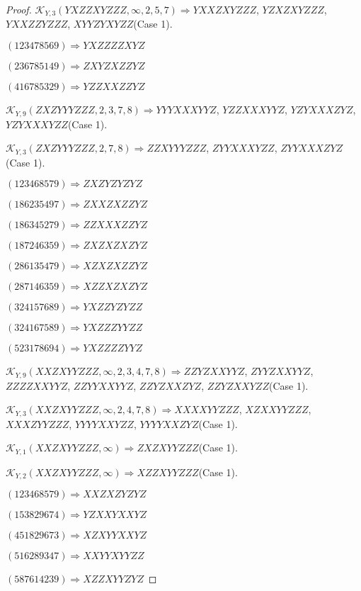 \documentclass[12pt]{article}
\theoremstyle{plain}
\theoremstyle{definition}
\theoremstyle{remark}
\newcommand{\fancy}[1]{\mathcal{#1}}
\def\K{\fancy{K}}
\begin{document}
\begin{proof}
	$\K_{Y,3}(YXZZXYZZZ,\infty,2, 5, 7)\Rightarrow $$YXXZXYZZZ$, $YZXZXYZZZ$, $YXXZZYZZZ$, $XYYZYXYZZ$(Case 1).
	
	
	
	$(1 2 3 4 7 8 5 6 9)\Rightarrow YXZZZZXYZ$
	
	$(2 3 6 7 8 5 1 4 9)\Rightarrow ZXYZXZZYZ$
	
	$(4 1 6 7 8 5 3 2 9)\Rightarrow YZZXXZZYZ$
	
	
	
	$\K_{Y,9}(ZXZYYYZZZ,2, 3, 7, 8)\Rightarrow $$YYYXXXYYZ$, $YZZXXXYYZ$, $YZYXXXZYZ$, $YZYXXXYZZ$(Case 1).
	
	$\K_{Y,3}(ZXZYYYZZZ,2, 7, 8)\Rightarrow $$ZZXYYYZZZ$, $ZYYXXXYZZ$, $ZYYXXXZYZ$(Case 1).
	
	
	
	$(1 2 3 4 6 8 5 7 9)\Rightarrow ZXZYZYZYZ$
	
	$(1 8 6 2 3 5 4 9 7)\Rightarrow ZXXZXZZYZ$
	
	$(1 8 6 3 4 5 2 7 9)\Rightarrow ZZXXXZZYZ$
	
	$(1 8 7 2 4 6 3 5 9)\Rightarrow ZXZXZXZYZ$
	
	$(2 8 6 1 3 5 4 7 9)\Rightarrow XZXZXZZYZ$
	
	$(2 8 7 1 4 6 3 5 9)\Rightarrow XZZXZXZYZ$
	
	$(3 2 4 1 5 7 6 8 9)\Rightarrow YXZZYZYZZ$
	
	$(3 2 4 1 6 7 5 8 9)\Rightarrow YXZZZYYZZ$
	
	$(5 2 3 1 7 8 6 9 4)\Rightarrow YXZZZZYYZ$
	
	
	
	$\K_{Y,9}(XXZXYYZZZ,\infty,2, 3, 4, 7, 8)\Rightarrow $$ZZYZXXYYZ$, $ZYYZXXYYZ$, $ZZZZXXYYZ$, $ZZYYXXYYZ$, $ZZYZXXZYZ$, $ZZYZXXYZZ$(Case 1).
	
	$\K_{Y,3}(XXZXYYZZZ,\infty,2, 4, 7, 8)\Rightarrow $$XXXXYYZZZ$, $XZXXYYZZZ$, $XXXZYYZZZ$, $YYYYXXYZZ$, $YYYYXXZYZ$(Case 1).
	
	$\K_{Y,1}(XXZXYYZZZ,\infty)\Rightarrow $$ZXZXYYZZZ$(Case 1).
	
	$\K_{Y,2}(XXZXYYZZZ,\infty)\Rightarrow $$XZZXYYZZZ$(Case 1).
	
	
	
	$(1 2 3 4 6 8 5 7 9)\Rightarrow XXZXZYZYZ$
	
	$(1 5 3 8 2 9 6 7 4)\Rightarrow YZXXYXXYZ$
	
	$(4 5 1 8 2 9 6 7 3)\Rightarrow XZXYYXXYZ$
	
	$(5 1 6 2 8 9 3 4 7)\Rightarrow XXYYXYYZZ$
	
	$(5 8 7 6 1 4 2 3 9)\Rightarrow XZZXYYZYZ$
	

\end{proof}
\end{document}

